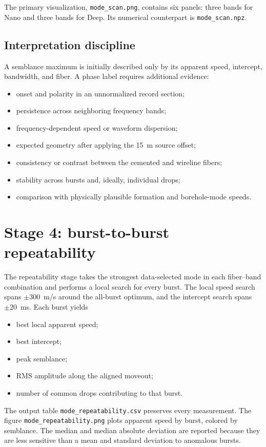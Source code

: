 \documentclass[11pt]{article}
\newcommand{\code}[1]{\texttt{#1}}
\begin{document}
The primary visualization, \code{mode\_scan.png}, contains six panels: three
bands for Nano and three bands for Deep.  Its numerical counterpart is
\code{mode\_scan.npz}.

\subsection{Interpretation discipline}

A semblance maximum is initially described only by its apparent speed,
intercept, bandwidth, and fiber.  A phase label requires additional evidence:
\begin{itemize}
    \item onset and polarity in an unnormalized record section;
    \item persistence across neighboring frequency bands;
    \item frequency-dependent speed or waveform dispersion;
    \item expected geometry after applying the 15~m source offset;
    \item consistency or contrast between the cemented and wireline fibers;
    \item stability across bursts and, ideally, individual drops;
    \item comparison with physically plausible formation and borehole-mode
          speeds.
\end{itemize}

\section{Stage 4: burst-to-burst repeatability}

The repeatability stage takes the strongest data-selected mode in each
fiber--band combination and performs a local search for every burst.  The local
speed search spans $\pm300$~m/s around the all-burst optimum, and the intercept
search spans $\pm20$~ms.  Each burst yields
\begin{itemize}
    \item best local apparent speed;
    \item best intercept;
    \item peak semblance;
    \item RMS amplitude along the aligned moveout;
    \item number of common drops contributing to that burst.
\end{itemize}

The output table \code{mode\_repeatability.csv} preserves every measurement.
The figure \code{mode\_repeatability.png} plots apparent speed by burst, colored
by semblance.  The median and median absolute deviation are reported because
they are less sensitive than a mean and standard deviation to anomalous bursts.
\end{document}
